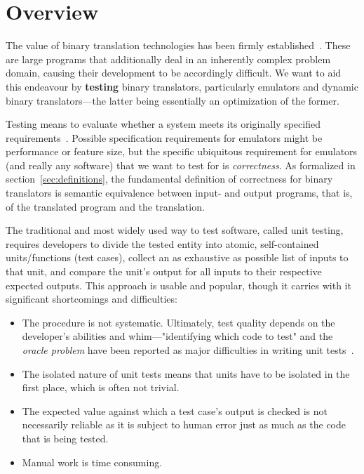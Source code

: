 \chapter{Overview}

The value of binary translation technologies has been firmly established~\cite{altman2000welcome, sites1993binary,
probst2002dynamic}. These are large programs that additionally deal in an inherently complex problem domain, causing
their development to be accordingly difficult. We want to aid this endeavour by \textbf{testing} binary translators,
particularly emulators and dynamic binary translators---the latter being essentially an optimization of the former.

Testing means to evaluate whether a system meets its originally specified requirements~\cite{jamil2016software_testing}.
Possible specification requirements for emulators might be performance or feature size, but the specific ubiquitous
requirement for emulators (and really any software) that we want to test for is \textit{correctness}. As formalized in
section~\ref{sec:definitions}, the fundamental definition of correctness for binary translators is semantic equivalence
between input- and output programs, that is, of the translated program and the translation.

The traditional and most widely used way to test software, called unit testing, requires developers to divide the tested
entity into atomic, self-contained units/functions (test cases), collect an as exhaustive as possible list of inputs to
that unit, and compare the unit's output for all inputs to their respective expected outputs. This approach is usable
and popular, though it carries with it significant shortcomings and difficulties:

\begin{itemize}
    \item The procedure is not systematic. Ultimately, test quality depends on the developer's abilities and
        whim---"identifying which code to test" and the \textit{oracle problem} have been reported as major
        difficulties in writing unit tests~\cite{Daka+2014UnitTestingSurvey}.
    \item The isolated nature of unit tests means that units have to be isolated in the first place, which is often not
        trivial.
    \item The expected value against which a test case's output is checked is not necessarily reliable as it is subject
        to human error just as much as the code that is being tested.
    \item Manual work is time consuming.
\end{itemize}

